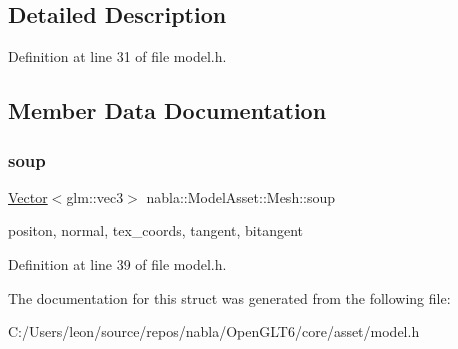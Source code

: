 \subsection{Detailed Description}


Definition at line 31 of file model.\+h.



\subsection{Member Data Documentation}
\mbox{\label{structnabla_1_1_model_asset_1_1_mesh_afb697cbd8f5293d005a0f4cf958e68ee}} 
\subsubsection{\texorpdfstring{soup}{soup}}
{\footnotesize\ttfamily \mbox{\hyperlink{classnabla_1_1_s_t_l_vector_ex}{Vector}}$<$glm\+::vec3$>$ nabla\+::\+Model\+Asset\+::\+Mesh\+::soup}

positon, normal, tex\+\_\+coords, tangent, bitangent 

Definition at line 39 of file model.\+h.



The documentation for this struct was generated from the following file\+:\begin{DoxyCompactItemize}
\item 
C\+:/\+Users/leon/source/repos/nabla/\+Open\+G\+L\+T6/core/asset/model.\+h\end{DoxyCompactItemize}
